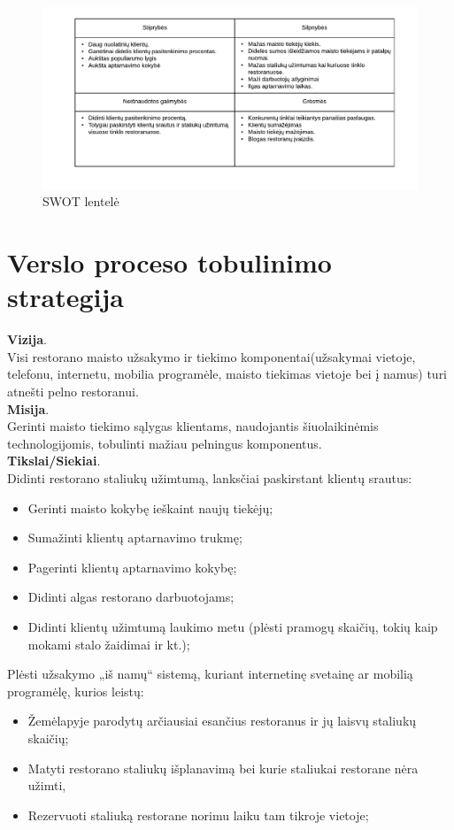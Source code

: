 \documentclass{VUMIFPSkursinis}
\begin{document}
	\begin {figure}[H]
	\centering
		\caption{SWOT lentelė}
		\includegraphics[scale=1]{img/3lab/Diagrama9}
		
		\label{fig:diagrama9}
	\end{figure}

\section{Verslo proceso tobulinimo strategija}
\noindent \textbf{Vizija}.\\
Visi restorano maisto užsakymo ir tiekimo komponentai(užsakymai vietoje, telefonu, internetu, mobilia programėle, maisto tiekimas vietoje bei į namus) turi atnešti pelno restoranui.\\
\textbf{Misija}.\\
Gerinti maisto tiekimo sąlygas klientams, naudojantis šiuolaikinėmis technologijomis, tobulinti mažiau pelningus komponentus.\\
\textbf{Tikslai/Siekiai}.\\
Didinti restorano staliukų užimtumą, lanksčiai paskirstant klientų srautus:
	\begin{itemize}
	\item Gerinti maisto kokybę ieškaint naujų tiekėjų;
	\item Sumažinti klientų aptarnavimo trukmę;
	\item Pagerinti klientų aptarnavimo kokybę;
	\item Didinti algas restorano darbuotojams;
	\item Didinti klientų užimtumą laukimo metu (plėsti pramogų skaičių, tokių kaip mokami stalo žaidimai ir kt.);
	\end{itemize}
Plėsti užsakymo „iš namų“ sistemą, kuriant internetinę svetainę ar mobilią programėlę, kurios leistų:
	\begin{itemize}
	\item Žemėlapyje parodytų arčiausiai esančius restoranus ir jų laisvų staliukų skaičių;
	\item Matyti restorano staliukų išplanavimą bei kurie staliukai restorane nėra užimti,
	\item Rezervuoti staliuką restorane norimu laiku tam tikroje vietoje;
	\end{itemize}
\end{document}
